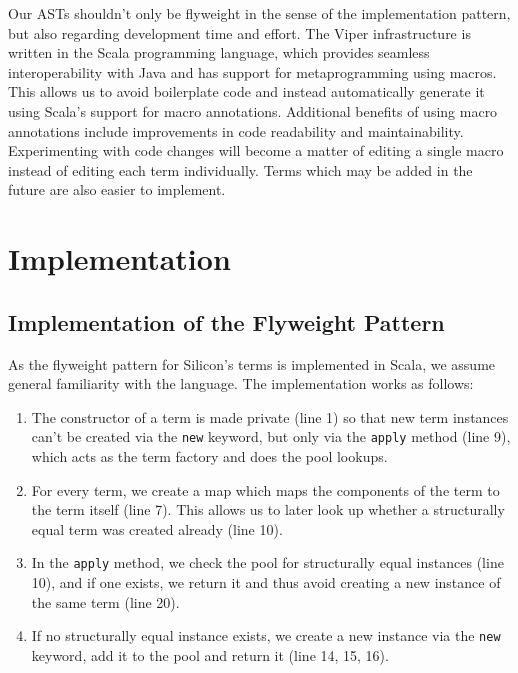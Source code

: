 \documentclass[11pt]{article}
\begin{document}
    Our ASTs shouldn't only be flyweight in the sense of the implementation pattern, but also
    regarding development time and effort.
    The Viper infrastructure is written in the Scala programming language, which 
    provides seamless interoperability with Java and has support
    for metaprogramming using macros. \cite{macros} This allows us to avoid boilerplate
    code and instead automatically generate it using Scala's support for macro annotations.
    Additional benefits of using macro annotations include improvements in code
    readability and maintainability. Experimenting with code changes will become a matter
    of editing a single macro instead of editing each term individually.
    Terms which may be added in the future are also easier to implement.

    \newpage
    \section{Implementation}

    \subsection{Implementation of the Flyweight Pattern} \label{implementation-flyweight-pattern}

    As the flyweight pattern for Silicon's terms is implemented in Scala,
    we assume general familiarity with the language. 
    The implementation works as follows:

    \begin{enumerate}
        \item The constructor of a term is made private (line 1) so that new term instances can't be created via
            the \texttt{new} keyword, but only via the \texttt{apply} method (line 9), which acts as the
            term factory and does the pool lookups.
        \item For every term, we create a map which maps the components of the term to the term itself (line 7).
            This allows us to later look up whether a structurally equal term was created already (line 10).
        \item In the \texttt{apply} method, we check the pool for structurally equal instances (line 10),
            and if one exists, we return it and thus avoid creating a new instance of the
            same term (line 20).
        \item If no structurally equal instance exists, we create a new instance via the \texttt{new}
            keyword, add it to the pool and return it (line 14, 15, 16).
    \end{enumerate}
\end{document}
